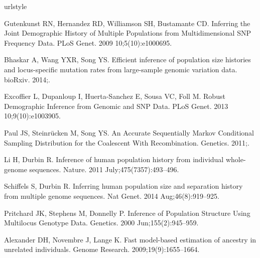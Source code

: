 \documentclass[10pt,letterpaper]{article}
\begin{document}
\nolinenumbers

%
%
% 
\begin{thebibliography}{80}
\providecommand{\natexlab}[1]{#1}
\providecommand{\url}[1]{\texttt{#1}}
\expandafter\ifx\csname urlstyle\endcsname\relax
  \providecommand{\doi}[1]{doi: #1}\else
  \providecommand{\doi}{doi: \begingroup \urlstyle{rm}\Url}\fi

Gutenkunst RN, Hernandez RD, Williamson SH, Bustamante CD.
\newblock Inferring the Joint Demographic History of Multiple Populations from
  Multidimensional {SNP} Frequency Data.
\newblock PLoS Genet. 2009 10;5(10):e1000695.

Bhaskar A, Wang YXR, Song YS.
\newblock Efficient inference of population size histories and locus-specific
  mutation rates from large-sample genomic variation data.
\newblock bioRxiv. 2014;.

Excoffier L, Dupanloup I, Huerta-Sanchez E, Sousa VC, Foll M.
\newblock Robust Demographic Inference from Genomic and {SNP} Data.
\newblock PLoS Genet. 2013 10;9(10):e1003905.

Paul JS, Steinr{\"u}cken M, Song YS.
\newblock An Accurate Sequentially {Markov} Conditional Sampling Distribution
  for the Coalescent With Recombination.
\newblock Genetics. 2011;.

Li H, Durbin R.
\newblock Inference of human population history from individual whole-genome
  sequences.
\newblock Nature. 2011 July;475(7357):493--496.

Schiffels S, Durbin R.
\newblock Inferring human population size and separation history from multiple
  genome sequences.
\newblock Nat Genet. 2014 Aug;46(8):919--925.

Pritchard JK, Stephens M, Donnelly P.
\newblock Inference of Population Structure Using Multilocus Genotype Data.
\newblock Genetics. 2000 Jun;155(2):945--959.

Alexander DH, Novembre J, Lange K.
\newblock Fast model-based estimation of ancestry in unrelated individuals.
\newblock Genome Research. 2009;19(9):1655--1664.


\end{thebibliography}
\end{document}
